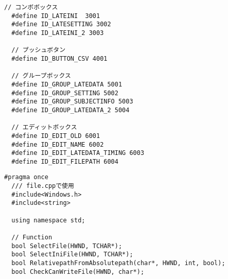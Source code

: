 \begin{lstlisting}[caption=window.h]
  // コンボボックス
  #define ID_LATEINI  3001
  #define ID_LATESETTING 3002
  #define ID_LATEINI_2 3003

  // プッシュボタン
  #define ID_BUTTON_CSV 4001

  // グループボックス
  #define ID_GROUP_LATEDATA 5001
  #define ID_GROUP_SETTING 5002
  #define ID_GROUP_SUBJECTINFO 5003
  #define ID_GROUP_LATEDATA_2 5004

  // エディットボックス
  #define ID_EDIT_OLD 6001
  #define ID_EDIT_NAME 6002
  #define ID_EDIT_LATEDATA_TIMING 6003
  #define ID_EDIT_FILEPATH 6004
\end{lstlisting}

\begin{lstlisting}[caption=file.h]
  #pragma once
  /// file.cppで使用
  #include<Windows.h>
  #include<string>

  using namespace std;

  // Function
  bool SelectFile(HWND, TCHAR*);
  bool SelectIniFile(HWND, TCHAR*);
  bool RelativepathFromAbsolutepath(char*, HWND, int, bool);
  bool CheckCanWriteFile(HWND, char*);
\end{lstlisting}